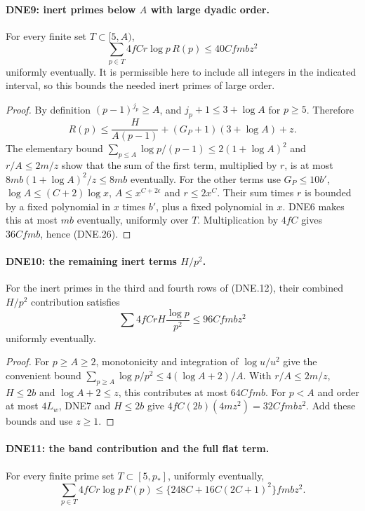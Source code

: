 \paragraph{DNE9: inert primes below $A$ with large dyadic order.}
\label{claim:DNE9}
For every finite set $T\subset[5,A)$,
\[
        \sum_{p\in T}4fCr\log p\,R(p)\le40Cfm bz^2       \tag{DNE.26}
\]
uniformly eventually.  It is permissible here to include all
integers in the indicated interval, so this bounds the needed
inert primes of large order.

\begin{proof}
By definition $(p-1)^{j_p}\ge A$, and
$j_p+1\le3+\log A$ for $p\ge5$.  Therefore
\[
 R(p)\le\frac H{A(p-1)}+(G_P+1)(3+\log A)+z.
\]
The elementary bound
$\sum_{p\le A}\log p/(p-1)\le2(1+\log A)^2$ and $r/A\le2m/z$
show that the sum of the first term, multiplied by $r$, is at
most $8mb(1+\log A)^2/z\le8mb$ eventually.
For the other terms use $G_P\le10b'$, $\log A\le(C+2)\log x$,
$A\le x^{C+2\epsilon}$ and $r\le2x^C$.
Their sum times $r$ is bounded by a fixed polynomial in $x$
times $b'$, plus a fixed polynomial in $x$.  DNE6 makes this
at most $mb$ eventually, uniformly over $T$.
Multiplication by $4fC$ gives $36Cfm b$, hence (DNE.26).
\end{proof}

\paragraph{DNE10: the remaining inert terms $H/p^2$.}
\label{claim:DNE10}
For the inert primes in the third and fourth rows of (DNE.12),
their combined $H/p^2$ contribution satisfies
\[
 \sum 4fCrH\frac{\log p}{p^2}\le96Cfm bz^2              \tag{DNE.27}
\]
uniformly eventually.

\begin{proof}
For $p\ge A\ge2$, monotonicity and integration of $\log u/u^2$
give the convenient bound
$\sum_{p\ge A}\log p/p^2\le4(\log A+2)/A$.
With $r/A\le2m/z$, $H\le2b$ and
$\log A+2\le z$, this contributes at most $64Cfm b$.
For $p<A$ and order at most $4L_w$, DNE7 and $H\le2b$ give
$4fC(2b)(4mz^2)=32Cfm bz^2$.  Add these bounds and use $z\ge1$.
\end{proof}

\paragraph{DNE11: the band contribution and the full flat term.}
\label{claim:DNE11}
For every finite prime set $T\subset[5,p_*]$, uniformly eventually,
\[
 \sum_{p\in T}4fCr\log p\,F(p)
 \le\{248C+16C(2C+1)^2\}fm bz^2.                      \tag{DNE.28}
\]

